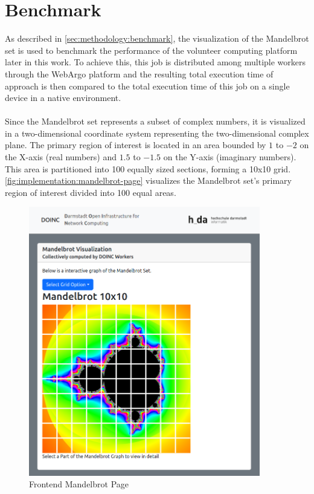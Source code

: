 \section{Benchmark}
\label{sec:implementation:benchmark}
As described in \autoref{sec:methodology:benchmark}, the visualization of the Mandelbrot set is used to benchmark the performance of the volunteer computing platform later in this work. To achieve this, this job is distributed among multiple workers through the WebArgo platform and the resulting total execution time of approach is then compared to the total execution time of this job on a single device in a native environment.
\\~\\
Since the Mandelbrot set represents a subset of complex numbers, it is visualized in a two-dimensional coordinate system representing the two-dimensional complex plane. The primary region of interest is located in an area bounded by $1$ to $-2$ on the X-axis (real numbers) and $1.5$ to $-1.5$ on the Y-axis (imaginary numbers). This area is partitioned into 100 equally sized sections, forming a 10x10 grid. \autoref{fig:implementation:mandelbrot-page} visualizes the Mandelbrot set's primary region of interest divided into 100 equal areas. 
\begin{figure}[htbp]
    \centering
    \includegraphics[width=0.9\textwidth]{gfx/figures/mandelbrot-page.png}
    \caption{Frontend Mandelbrot Page}
    \label{fig:implementation:mandelbrot-page}
\end{figure}
